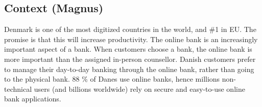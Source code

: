 \subsection{Context (Magnus)}
Denmark is one of the most digitized countries in the world, and \#1 in EU\cite{danmark_mest_digi}. The promise is that this will increase productivity\cite{digitalisering_oeger_produktivitet}.  The online bank is an increasingly important aspect of a bank. When customers choose a bank, the online bank is more important than the assigned in-person counsellor\cite{netbank_raadgiver}. Danish customers prefer to manage their day-to-day banking through the online bank, rather than going to the physical bank\cite{netbank_foretrukken}. 88 \% of Danes use online banks\cite{danskere_bruger_netbank}, hence millions non-technical users (and billions worldwide) rely on secure and easy-to-use online bank applications.

